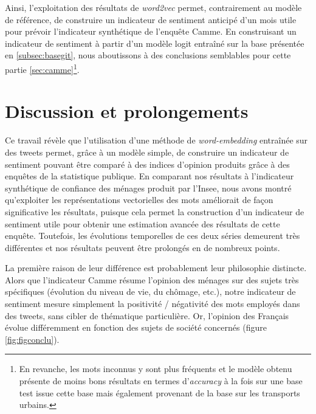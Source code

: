 \documentclass[11pt,french,french]{article}
\let\rmarkdownfootnote\footnote%
\def\footnote{\protect\rmarkdownfootnote}
\begin{document}
Ainsi, l'exploitation des résultats de \emph{word2vec} permet,
contrairement au modèle de référence, de construire un indicateur de
sentiment anticipé d'un mois utile pour prévoir l'indicateur synthétique
de l'enquête Camme. En construisant un indicateur de sentiment à partir
d'un modèle logit entraîné sur la base présentée en
\ref{subsec:basegit}, nous aboutissons à des conclusions semblables pour
cette partie \ref{sec:camme}\footnote{En revanche, les mots inconnus y
  sont plus fréquents et le modèle obtenu présente de moins bons
  résultats en termes d'\emph{accuracy} à la fois sur une base test
  issue cette base mais également provenant de la base sur les
  transports urbains.}.

\section*{Discussion et
prolongements}\label{discussion-et-prolongements}

Ce travail révèle que l'utilisation d'une méthode de
\emph{word-embedding} entraînée sur des tweets permet, grâce à un modèle
simple, de construire un indicateur de sentiment pouvant être comparé à
des indices d'opinion produits grâce à des enquêtes de la statistique
publique. En comparant nos résultats à l'indicateur synthétique de
confiance des ménages produit par l'Insee, nous avons montré
qu'exploiter les représentations vectorielles des mots améliorait de
façon significative les résultats, puisque cela permet la construction
d'un indicateur de sentiment utile pour obtenir une estimation avancée
des résultats de cette enquête. Toutefois, les évolutions temporelles de
ces deux séries demeurent très différentes et nos résultats peuvent être
prolongés en de nombreux points.

La première raison de leur différence est probablement leur philosophie
distincte. Alors que l'indicateur Camme résume l'opinion des ménages sur
des sujets très spécifiques (évolution du niveau de vie, du chômage,
etc.), notre indicateur de sentiment mesure simplement la positivité /
négativité des mots employés dans des tweets, sans cibler de thématique
particulière. Or, l'opinion des Français évolue différemment en fonction
des sujets de société concernés (figure \ref{fig:figconclu}).
\end{document}

